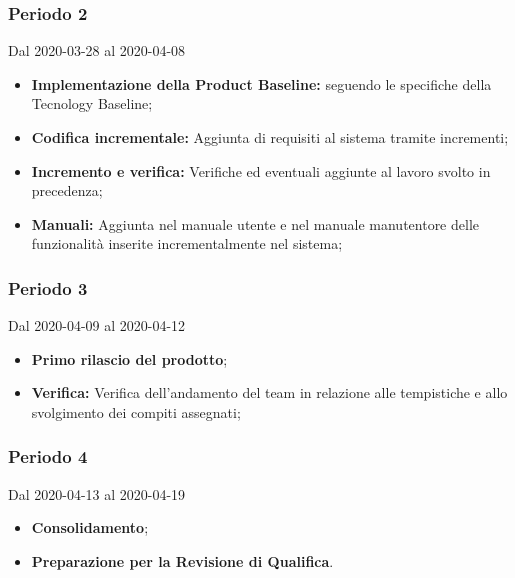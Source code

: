 \subsubsection{Periodo 2} 
Dal 2020-03-28 al 2020-04-08\\
\begin{itemize}
	\item \textbf{Implementazione della Product Baseline:} seguendo le specifiche della Tecnology Baseline;
	\item \textbf{Codifica incrementale:} Aggiunta di requisiti al sistema tramite incrementi;
	\item \textbf{Incremento e verifica:} Verifiche ed eventuali aggiunte al lavoro svolto in precedenza;
	\item \textbf{Manuali:} Aggiunta nel manuale utente e nel manuale manutentore delle funzionalità inserite incrementalmente nel sistema;
\end{itemize}
\subsubsection{Periodo 3}
Dal 2020-04-09 al 2020-04-12\\
\begin{itemize}
	\item \textbf{Primo rilascio del prodotto};
	\item \textbf{Verifica:} Verifica dell'andamento del team in relazione alle tempistiche e allo svolgimento dei compiti assegnati;
\end{itemize}
\subsubsection{Periodo 4} 
Dal 2020-04-13 al 2020-04-19\\
\begin{itemize}
	\item \textbf{Consolidamento};
	\item \textbf{Preparazione per la Revisione di Qualifica}.
\end{itemize}

